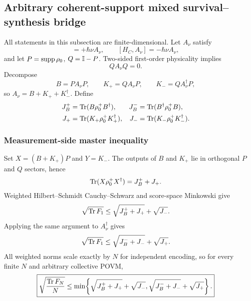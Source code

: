 
\subsection{Arbitrary coherent-support mixed survival--synthesis bridge}
\label{supp:mixed-full-proof-r1}

All statements in this subsection are finite-dimensional. Let $A_\nu$ satisfy
\begin{equation}
[H_S,A_\nu]=+\hbar\nu A_\nu,
\qquad
[H_C,A_\nu]=-\hbar\nu A_\nu,
\end{equation}
and let $P=\operatorname{supp}\rho_0$, $Q=\mathbb I-P$. Two-sided first-order physicality implies
\begin{equation}
QA_\nu Q=0.
\end{equation}
Decompose
\begin{equation}
B=PA_\nu P,
\qquad
K_+=QA_\nu P,
\qquad
K_-=QA_\nu^\dagger P,
\label{eq:mixed-r1-decomp}
\end{equation}
so $A_\nu=B+K_++K_-^\dagger$. Define
\begin{align}
J_B^+&=\operatorname{Tr}(B\rho_0^+B^\dagger),&
J_B^-&=\operatorname{Tr}(B^\dagger\rho_0^+B),\\
J_+&=\operatorname{Tr}(K_+\rho_0^+K_+^\dagger),&
J_-&=\operatorname{Tr}(K_-\rho_0^+K_-^\dagger).
\end{align}

\subsubsection{Measurement-side master inequality}

Set $X=(B+K_+)P$ and $Y=K_-$. The outputs of $B$ and $K_+$ lie in orthogonal $P$ and $Q$ sectors, hence
\begin{equation}
\operatorname{Tr}(X\rho_0^+X^\dagger)=J_B^++J_+.
\end{equation}
Weighted Hilbert--Schmidt Cauchy--Schwarz and score-space Minkowski give
\begin{equation}
\sqrt{\operatorname{Tr} F_1}
\le
\sqrt{J_B^++J_+}+\sqrt{J_-}.
\end{equation}
Applying the same argument to $A_\nu^\dagger$ gives
\begin{equation}
\sqrt{\operatorname{Tr} F_1}
\le
\sqrt{J_B^-+J_-}+\sqrt{J_+}.
\end{equation}
All weighted norms scale exactly by $N$ for independent encoding, so for every finite $N$ and arbitrary collective POVM,
\begin{equation}
\boxed{
\sqrt{\frac{\operatorname{Tr} F_N}{N}}
\le
\min\!\left\{
\sqrt{J_B^++J_+}+\sqrt{J_-},
\sqrt{J_B^-+J_-}+\sqrt{J_+}
\right\}.
}
\label{eq:mixed-r1-measurement}
\end{equation}

